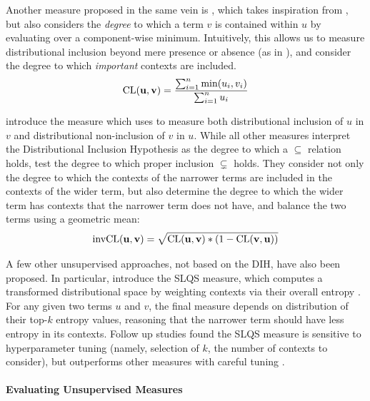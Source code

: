 Another measure proposed in the same vein is {\Clarke} \cite{clarke:2009:gems},
which takes inspiration from , but also considers
the {\em degree} to which a term $v$ is contained within $u$ by evaluating
over a component-wise minimum. Intuitively, this allows us to measure
distributional inclusion beyond mere presence or absence (as in \WeedsPrec),
and consider the degree to which {\em important} contexts are included.
\begin{equation}
  \mbox{CL}({\mathbf{u}}, {\mathbf{v}}) = \frac{\sum_{i=1}^n \mbox{min}(u_i, v_i)}{\sum_{i=1}^n u_i}
\end{equation}

 introduce the \mbox{\invCL} measure which uses
{\Clarke} to measure both distributional inclusion of $u$ in $v$ and
distributional non-inclusion of $v$ in $u$. While all other measures interpret
the Distributional Inclusion Hypothesis as the degree to which a $\subseteq$
relation holds,  test the degree to which proper
inclusion $\subsetneq$ holds. They consider not only the degree to which the
contexts of the narrower terms are included in the contexts of the wider term,
but also determine the degree to which the wider term has contexts that the
narrower term does not have, and balance the two terms using a geometric mean:
\begin{equation}
    \mbox{invCL}({\mathbf{u}}, {\mathbf{v}}) = \sqrt{\mbox{CL}({\mathbf{u}}, {\mathbf{v}}) * (1 - \mbox{CL}({\mathbf{v}}, {\mathbf{u}}))}
  \label{eq:invcl}
\end{equation}

A few other unsupervised approaches, not based on the DIH, have also been
proposed. In particular,  introduce the SLQS measure,
which computes a transformed distributional space by weighting contexts via
their overall entropy \cite{shannon:1948:bell}. For any given two terms
$u$ and $v$, the final measure depends on distribution of their top-$k$ entropy
values, reasoning that the narrower term should have less entropy in its
contexts.  Follow up studies found the SLQS measure is sensitive to
hyperparameter tuning (namely, selection of $k$, the number of contexts to
consider), but outperforms other measures with careful tuning
\cite{shwartz:2017:eacl}.

\paragraph{Evaluating Unsupervised Measures}

